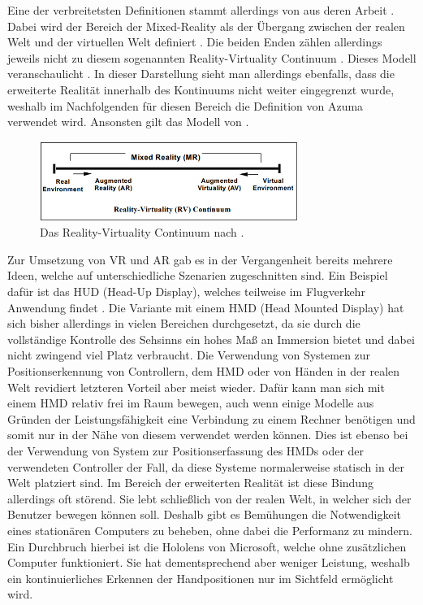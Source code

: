 	
	Eine der verbreitetsten Definitionen stammt allerdings von  aus deren Arbeit . Dabei wird der Bereich der Mixed-Reality als der Übergang zwischen der realen Welt und der virtuellen Welt definiert \cite{milgram}. Die beiden Enden zählen allerdings jeweils nicht zu diesem sogenannten Reality-Virtuality Continuum \cite{milgram}. Dieses Modell veranschaulicht . In dieser Darstellung sieht man allerdings ebenfalls, dass die erweiterte Realität innerhalb des Kontinuums nicht weiter eingegrenzt wurde, weshalb im Nachfolgenden für diesen Bereich die Definition von Azuma verwendet wird. Ansonsten gilt das Modell von  .
	
	\begin{figure}[htbp]
		\centering
		\includegraphics[width=0.75\textwidth]{figures/mixed_reality.png}
		\caption{Das Reality-Virtuality Continuum nach  .}
		\label{fig:mixed_reality}
	\end{figure}
	
	Zur Umsetzung von VR und AR gab es in der Vergangenheit bereits mehrere Ideen, welche auf unterschiedliche Szenarien zugeschnitten sind.
	Ein Beispiel dafür ist das HUD (Head-Up Display), welches teilweise im Flugverkehr Anwendung findet \cite{azuma}. 
	Die Variante mit einem HMD (Head Mounted Display) hat sich bisher allerdings in vielen Bereichen durchgesetzt, da sie durch die vollständige Kontrolle des Sehsinns ein hohes Maß an Immersion bietet und dabei nicht zwingend viel Platz verbraucht. Die Verwendung von Systemen zur Positionserkennung von Controllern, dem HMD oder von Händen in der realen Welt revidiert letzteren Vorteil aber meist wieder. Dafür kann man sich mit einem HMD relativ frei im Raum bewegen, auch wenn einige Modelle aus Gründen der Leistungsfähigkeit eine Verbindung zu einem Rechner benötigen und somit nur in der Nähe von diesem verwendet werden können. Dies ist ebenso bei der Verwendung von System zur Positionserfassung des HMDs oder der verwendeten Controller der Fall, da diese Systeme normalerweise statisch in der Welt platziert sind. Im Bereich der erweiterten Realität ist diese Bindung allerdings oft störend. Sie lebt schließlich von der realen Welt, in welcher sich der Benutzer bewegen können soll. Deshalb gibt es Bemühungen die Notwendigkeit eines stationären Computers zu beheben, ohne dabei die Performanz zu mindern. Ein Durchbruch hierbei ist die Hololens von Microsoft, welche ohne zusätzlichen Computer funktioniert. Sie hat dementsprechend aber weniger Leistung, weshalb ein kontinuierliches Erkennen der Handpositionen nur im Sichtfeld ermöglicht wird.

